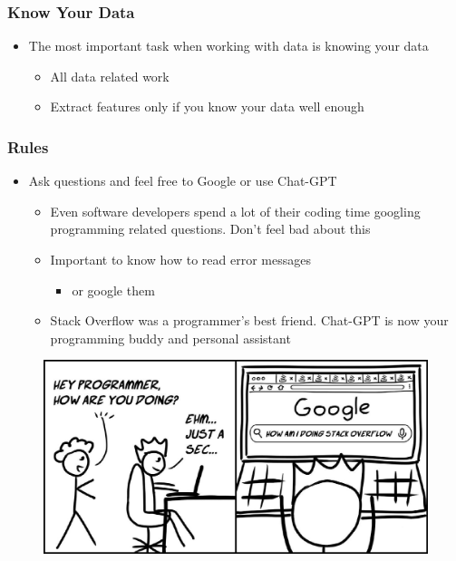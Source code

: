 \documentclass[compress, aspectratio=54]{beamer}
\begin{document}
\begin{frame}
\frametitle{Know Your Data}
\begin{itemize}
\item The most important task when working with data is knowing your data
\begin{itemize}
\item All data related work 
\item Extract features only if you know your data well enough
\end{itemize}
\end{itemize}
\end{frame}




\begin{frame}
\frametitle{Rules}
\begin{itemize}
\item Ask questions and feel free to Google or use Chat-GPT
\begin{itemize}
\item Even software developers spend a lot of their coding time googling programming related questions. Don't feel bad about this
\item Important to know how to read error messages
\begin{itemize}

\item or google them
\end{itemize}
\item Stack Overflow was a programmer's best friend. Chat-GPT is now your programming buddy and personal assistant
\end{itemize}
\end{itemize}
\end{frame}


\begin{frame}
\begin{figure}

\includegraphics[width=0.6\linewidth ]{../Figures/stack-overflow.jpeg}
\end{figure}

\end{frame}
\end{document}
